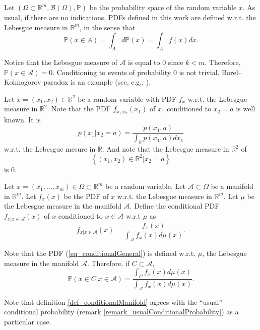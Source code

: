 Let $(\Omega \subset \mathbb{R}^m, \mathcal{B}(\Omega), \mathbb{P})$ be the probability space of the random variable $x$.
As usual, if there are no indications, PDFs defined in this work are defined w.r.t. the Lebesgue measure in $\mathbb{R}^m$, in the sense that
$$
  \mathbb{P}(x \in A) = \int_A d\mathbb{P}(x) = \int_A f(x)dx.
$$

Notice that the Lebesgue measure of $\mathcal{A}$ is equal to $0$ since $k<m$.
Therefore, $\mathbb{P}(x \in \mathcal{A}) = 0$.
Conditioning to events of probability $0$ is not trivial.
Borel–Kolmogorov paradox is an example (see, e.g., \textcite{rescorla2015}).

\begin{remark} \label{remark_usualConditionalProbability}
Let $x=(x_1,x_2) \in \mathbb{R}^2$ be a random variable with PDF $f_{x}$ w.r.t. the Lebesgue measure in $\mathbb{R}^2$. Note that the PDF $f_{x_1|x_2}(x_1)$ of $x_1$ conditioned to $x_2 = a$ is well known. It is
$$
  p(x_1 | x_2=a) = \frac{p(x_1,a)}{\int_{\mathbb{R}}p(x_1,a)dx_1}
$$
w.r.t. the Lebesgue mesure in $\mathbb{R}$. 
And note that the Lebesgue measure in $\mathbb{R}^2$ of 
$$
  \left\{ (x_1,x_2)\in\mathbb{R}^2 | x_2 = a \right\}
$$
is $0$.
\end{remark}

\begin{definition} \label{def_conditionalManifold}
Let $x = (x_1,\dots,x_m)\in\Omega\subset\mathbb{R}^m$ be a random variable. Let $\mathcal{A}\subset \Omega$ be a manifold in $\mathbb{R}^m$. Let $f_x(x)$ be the PDF of $x$ w.r.t. the Lebesgue measure in $\mathbb{R}^m$. Let $\mu$ be the Lebesgue measure in the manifold $\mathcal{A}$. Define the conditional PDF $f_{x|x\in\mathcal{A}}(x)$ of $x$ conditioned to $x\in\mathcal{A}$ w.r.t $\mu$ as
\begin{equation} \label{eq_conditionalGeneral}
  f_{x | x\in\mathcal{A}}(x) = \frac{f_x(x)}{\int_{\mathcal{A}} f_x(x) d\mu(x)}.
\end{equation}
\end{definition}

\begin{remark}
Note that the PDF (\ref{eq_conditionalGeneral}) is defined w.r.t. $\mu$, the Lebesgue measure in the manifold $\mathcal{A}$. Therefore, if $C\subset\mathcal{A}$,
$$
  \mathbb{P}(x \in C | x\in\mathcal{A}) = \frac{\int_C f_x(x)d\mu(x)}{\int_{\mathcal{A}} f_x(x) d\mu(x)}.
$$
\end{remark}

\begin{remark}
Note that definition \ref{def_conditionalManifold} agrees with the ``usual'' conditional probability (remark \ref{remark_usualConditionalProbability}) as a particular case.
\end{remark}

